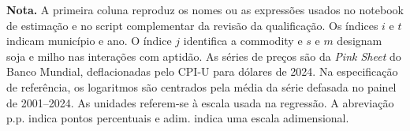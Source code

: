 \noindent\textbf{Nota.} A primeira coluna reproduz os nomes ou as expressões usados no notebook de estimação e no script complementar da revisão da qualificação. Os índices $i$ e $t$ indicam município e ano. O índice $j$ identifica a commodity e $s$ e $m$ designam soja e milho nas interações com aptidão. As séries de preços são da \textit{Pink Sheet} do Banco Mundial, deflacionadas pelo CPI-U para dólares de 2024. Na especificação de referência, os logaritmos são centrados pela média da série defasada no painel de 2001--2024. As unidades referem-se à escala usada na regressão. A abreviação p.p. indica pontos percentuais e adim. indica uma escala adimensional.
\par
\endgroup
